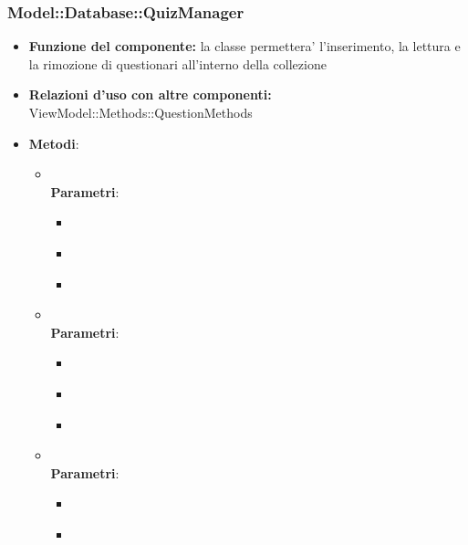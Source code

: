 \subsubsection{Model::Database::QuizManager}
\begin{itemize}
\item\textbf{Funzione del componente:} la classe permettera' l'inserimento, la lettura e la rimozione di questionari all'interno della collezione
\item\textbf{Relazioni d'uso con altre componenti:} ViewModel::Methods::QuestionMethods\\
\item\textbf{Metodi}:
\begin{itemize}
	\item{}\\
	\textbf{Parametri}:
	\begin{itemize}
		\item{}\\
		\item{}\\
		\item{}\\
	\end{itemize}
	\item{}\\
	\textbf{Parametri}:
	\begin{itemize}
		\item{}\\
		\item{}\\
		\item{}\\
	\end{itemize}
	\item{}\\
	\textbf{Parametri}:
	\begin{itemize}
		\item{}\\
		\item{}\\
	\end{itemize}
\end{itemize}


\end{itemize}
